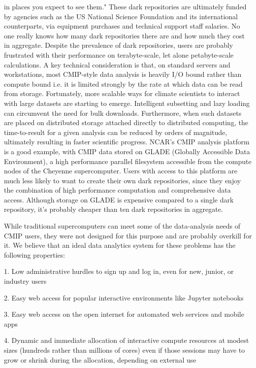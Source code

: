 \documentclass[gmd,manuscript]{copernicus}
\begin{document}
\begin{enumerate}[label=SC1-\arabic*,leftmargin=*]
  in places you expect to see them." These dark repositories are
  ultimately funded by agencies such as the US National Science
  Foundation and its international counterparts, via equipment
  purchases and technical support staff salaries. No one really knows
  how many dark repositories there are and how much they cost in
  aggregate. Despite the prevalence of dark repositories, users are
  probably frustrated with their performance on terabyte-scale, let
  alone petabyte-scale calculations. A key technical consideration is
  that, on standard servers and workstations, most CMIP-style data
  analysis is heavily I/O bound rather than compute bound i.e. it is
  limited strongly by the rate at which data can be read from storage.
  Fortunately, more scalable ways for climate scientists to interact
  with large datasets are starting to emerge. Intelligent subsetting
  and lazy loading can circumvent the need for bulk downloads.
  Furthermore, when such datasets are placed on distributed storage
  attached directly to distributed computing, the time-to-result for a
  given analysis can be reduced by orders of magnitude, ultimately
  resulting in faster scientific progress. NCAR’s CMIP analysis
  platform is a good example, with CMIP data stored on GLADE (Globally
  Accessible Data Environment), a high performance parallel filesystem
  accessible from the compute nodes of the Cheyenne supercomputer.
  Users with access to this platform are much less likely to want to
  create their own dark repositories, since they enjoy the combination
  of high performance computation and comprehensive data access.
  Although storage on GLADE is expensive compared to a single dark
  repository, it’s probably cheaper than ten dark repositories in
  aggregate.

  While traditional supercomputers can meet some of the data-analysis
  needs of CMIP users, they were not designed for this purpose and are
  probably overkill for it. We believe that an ideal data analytics
  system for these problems has the following properties:

  1. Low administrative hurdles to sign up and log in, even for new,
  junior, or industry users

  2. Easy web access for popular interactive environments like Jupyter
  notebooks

  3. Easy web access on the open internet for automated web services
  and mobile apps


  4. Dynamic and immediate allocation of interactive compute resources
  at modest sizes (hundreds rather than millions of cores) even if
  those sessions may have to grow or shrink during the allocation,
  depending on external use


\end{enumerate}
\end{document}
